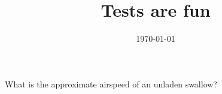 \documentclass[exam]{exam}
\title{Tests are fun}
\date{\today}
\author{\mobeardInstructorShort}
\begin{document}
\maketitle

\begin{questions}
\question[1] What is the approximate airspeed of an unladen swallow?
\end{questions}
\end{document}
